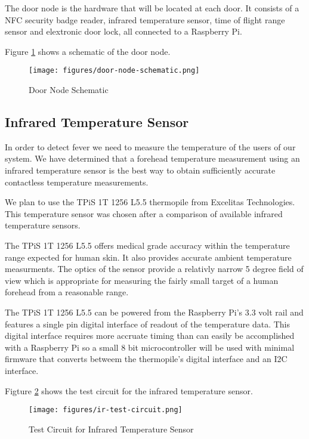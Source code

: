 The door node is the hardware that will be located at each door. It consists of
a NFC security badge reader, infrared temperature sensor, time of flight range
sensor and elextronic door lock, all connected to a Raspberry Pi.

Figure \ref{fig:door-node-schematic} shows a schematic of the door node.

\begin{figure}[!htb]
\centering
\texttt{[image: figures/door-node-schematic.png]}
\caption{Door Node Schematic}
\label{fig:door-node-schematic}
\end{figure}

\subsection{Infrared Temperature Sensor}

In order to detect fever we need to measure the temperature of the users of our
system. We have determined that a forehead temperature measurement using an
infrared temperature sensor is the best way to obtain sufficiently accurate
contactless temperature measurements.

We plan to use the TPiS 1T 1256 L5.5 thermopile from Excelitas Technologies.
This temperature sensor was chosen after a comparison of available infrared
temperature sensors.

The TPiS 1T 1256 L5.5 offers medical grade accuracy within the temperature range
expected for human skin. It also provides accurate ambient temperature
measurments. The optics of the sensor provide a relativly narrow 5 degree field
of view which is appropriate for measuring the fairly small target of a human
forehead from a reasonable range.

The TPiS 1T 1256 L5.5 can be powered from the Raspberry Pi's 3.3 volt rail and
features a single pin digital interface of readout of the temperature data. This
digital interface requires more accruate timing than can easily be accomplished
with a Raspberry Pi so a small 8 bit microcontroller will be used with minimal
firmware that converts betweem the thermopile's digital interface and an I2C
interface.

Figture \ref{fig:ir-test-circuit} shows the test circuit for the infrared
temperature sensor.

\begin{figure}[!htb]
\centering
\texttt{[image: figures/ir-test-circuit.png]}
\caption{Test Circuit for Infrared Temperature Sensor}
\label{fig:ir-test-circuit}
\end{figure}


